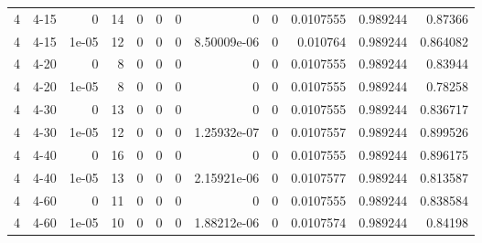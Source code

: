 \begin{tabular}{rlrrrrrrrrrr}
     4 & 4-15   &      0     &          14 &                 0 &                 0 &     0           &     0           &      0           &        0.0107555 &               0.989244 &           0.87366  \\
     4 & 4-15   &      1e-05 &          12 &                 0 &                 0 &     0           &     8.50009e-06 &      0           &        0.010764  &               0.989244 &           0.864082 \\
     4 & 4-20   &      0     &           8 &                 0 &                 0 &     0           &     0           &      0           &        0.0107555 &               0.989244 &           0.83944  \\
     4 & 4-20   &      1e-05 &           8 &                 0 &                 0 &     0           &     0           &      0           &        0.0107555 &               0.989244 &           0.78258  \\
     4 & 4-30   &      0     &          13 &                 0 &                 0 &     0           &     0           &      0           &        0.0107555 &               0.989244 &           0.836717 \\
     4 & 4-30   &      1e-05 &          12 &                 0 &                 0 &     0           &     1.25932e-07 &      0           &        0.0107557 &               0.989244 &           0.899526 \\
     4 & 4-40   &      0     &          16 &                 0 &                 0 &     0           &     0           &      0           &        0.0107555 &               0.989244 &           0.896175 \\
     4 & 4-40   &      1e-05 &          13 &                 0 &                 0 &     0           &     2.15921e-06 &      0           &        0.0107577 &               0.989244 &           0.813587 \\
     4 & 4-60   &      0     &          11 &                 0 &                 0 &     0           &     0           &      0           &        0.0107555 &               0.989244 &           0.838584 \\
     4 & 4-60   &      1e-05 &          10 &                 0 &                 0 &     0           &     1.88212e-06 &      0           &        0.0107574 &               0.989244 &           0.84198  \\
\hline
\end{tabular}
